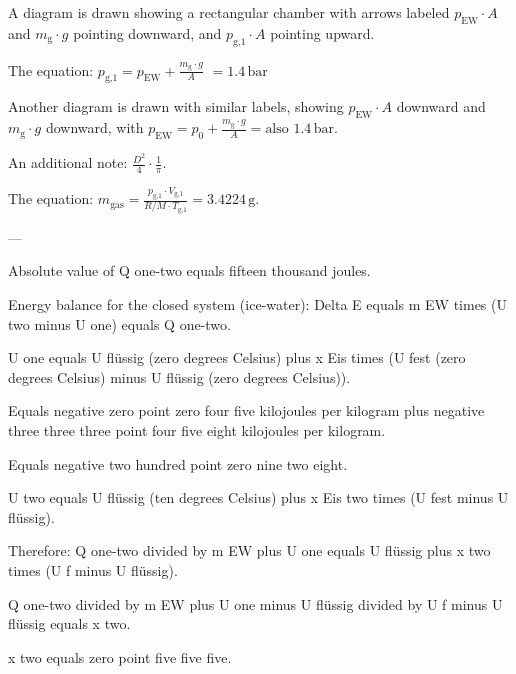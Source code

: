 A diagram is drawn showing a rectangular chamber with arrows labeled \( p_{\text{EW}} \cdot A \) and \( m_{\text{g}} \cdot g \) pointing downward, and \( p_{\text{g,1}} \cdot A \) pointing upward.  

The equation:  
\( p_{\text{g,1}} = p_{\text{EW}} + \frac{m_{\text{g}} \cdot g}{A} \)  
\( = 1.4 \, \text{bar} \)  

Another diagram is drawn with similar labels, showing \( p_{\text{EW}} \cdot A \) downward and \( m_{\text{g}} \cdot g \) downward, with \( p_{\text{EW}} = p_0 + \frac{m_{\text{g}} \cdot g}{A} = \text{also } 1.4 \, \text{bar} \).  

An additional note: \( \frac{D^2}{4} \cdot \frac{1}{\pi} \).  

The equation:  
\( m_{\text{gas}} = \frac{p_{\text{g,1}} \cdot V_{\text{g,1}}}{R / M \cdot T_{\text{g,1}}} = 3.4224 \, \text{g} \).  

---

Absolute value of Q one-two equals fifteen thousand joules.  

Energy balance for the closed system (ice-water):  
Delta E equals m EW times (U two minus U one) equals Q one-two.  

U one equals U flüssig (zero degrees Celsius) plus x Eis times (U fest (zero degrees Celsius) minus U flüssig (zero degrees Celsius)).  

Equals negative zero point zero four five kilojoules per kilogram plus negative three three three point four five eight kilojoules per kilogram.  

Equals negative two hundred point zero nine two eight.  

U two equals U flüssig (ten degrees Celsius) plus x Eis two times (U fest minus U flüssig).  

Therefore:  
Q one-two divided by m EW plus U one equals U flüssig plus x two times (U f minus U flüssig).  

Q one-two divided by m EW plus U one minus U flüssig divided by U f minus U flüssig equals x two.  

x two equals zero point five five five.